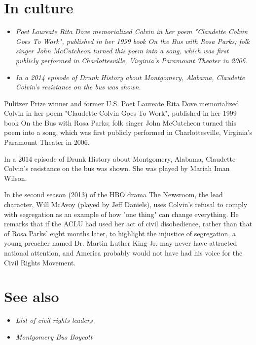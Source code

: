 \section{In culture}\label{in-culture}

\begin{itemize}
\item
  \emph{Poet Laureate Rita Dove memorialized Colvin in her poem
  "Claudette Colvin Goes To Work", published in her 1999 book On the Bus
  with Rosa Parks; folk singer John McCutcheon turned this poem into a
  song, which was first publicly performed in Charlottesville,
  Virginia's Paramount Theater in 2006.}
\item
  \emph{In a 2014 episode of Drunk History about Montgomery, Alabama,
  Claudette Colvin's resistance on the bus was shown.}
\end{itemize}

Pulitzer Prize winner and former U.S. Poet Laureate Rita Dove
memorialized Colvin in her poem "Claudette Colvin Goes To Work",
published in her 1999 book On the Bus with Rosa Parks; folk singer John
McCutcheon turned this poem into a song, which was first publicly
performed in Charlottesville, Virginia's Paramount Theater in 2006.

In a 2014 episode of Drunk History about Montgomery, Alabama, Claudette
Colvin's resistance on the bus was shown. She was played by Mariah Iman
Wilson.

In the second season (2013) of the HBO drama The Newsroom, the lead
character, Will McAvoy (played by Jeff Daniels), uses Colvin's refusal
to comply with segregation as an example of how "one thing" can change
everything. He remarks that if the ACLU had used her act of civil
disobedience, rather than that of Rosa Parks' eight months later, to
highlight the injustice of segregation, a young preacher named Dr.
Martin Luther King Jr. may never have attracted national attention, and
America probably would not have had his voice for the Civil Rights
Movement.

\section{See also}\label{see-also}

\begin{itemize}
\item
  \emph{List of civil rights leaders}
\item
  \emph{Montgomery Bus Boycott}
\end{itemize}

